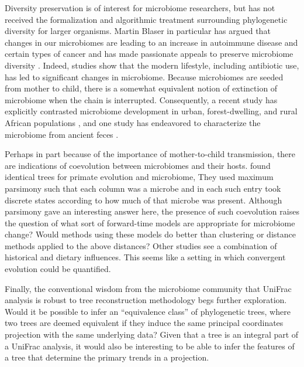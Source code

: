 \documentclass{amsart}
\begin{document}
Diversity preservation is of interest for microbiome researchers, but has not received the formalization and algorithmic treatment surrounding phylogenetic diversity for larger organisms.
Martin Blaser in particular has argued that changes in our microbiomes are leading to an increase in autoimmune disease and certain types of cancer and has made passionate appeals to preserve microbiome diversity \cite{blaser2011antibiotic,cho2012human}.
Indeed, studies show that the modern lifestyle, including antibiotic use, has led to significant changes in microbiome.
Because microbiomes are seeded from mother to child, there is a somewhat equivalent notion of extinction of microbiome when the chain is interrupted.
Consequently, a recent study has explicitly contrasted microbiome development in urban, forest-dwelling, and rural African populations \cite{yatsunenko2012human}, and one study has endeavored to characterize the microbiome from ancient feces \cite{tito2012insights}.

Perhaps in part because of the importance of mother-to-child transmission, there are indications of coevolution between microbiomes and their hosts.
\citet{ochman2010evolutionary} found identical trees for primate evolution and microbiome,
They used maximum parsimony such that each column was a microbe and in each such entry took discrete states according to how much of that microbe was present.
Although parsimony gave an interesting answer here, the presence of such coevolution raises the question of what sort of forward-time models are appropriate for microbiome change?
Would methods using these models do better than clustering or distance methods applied to the above distances?
Other studies \citep[e.g.][]{phillips2012microbiome,delsuc2013convergence} see a combination of historical and dietary influences.
This seems like a setting in which convergent evolution could be quantified.

Finally, the conventional wisdom from the microbiome community that UniFrac analysis is robust to tree reconstruction methodology begs further exploration.
Would it be possible to infer an ``equivalence class'' of phylogenetic trees, where two trees are deemed equivalent if they induce the same principal coordinates projection with the same underlying data?
Given that a tree is an integral part of a UniFrac analysis, it would also be interesting to be able to infer the features of a tree that determine the primary trends in a projection.
\end{document}
